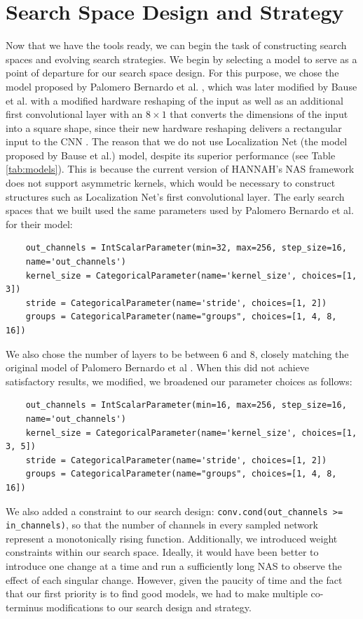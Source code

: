 \documentclass[11pt,a4paper, open=any]{scrbook}
\newcounter{constraint}[chapter]
\newcommand{\py}[1]{\texttt{#1}}
\begin{document}
\section{Search Space Design and Strategy}
Now that we have the tools ready, we can begin the task of constructing search spaces and evolving search strategies. We begin by selecting a model to serve as a point of departure for our search space design. For this purpose, we chose the model proposed by Palomero Bernardo et al. \cite[34]{bernardo25}, which was later modified by Bause et al. with a modified hardware reshaping of the input as well as an additional first convolutional layer with an $8\times 1$ that converts the dimensions of the input into a square shape, since their new hardware reshaping delivers a rectangular input to the CNN \cite[37]{bause25}. The reason that we do not use Localization Net (the model proposed by Bause et al.) model, despite its superior performance (see Table \ref{tab:models}). This is because the current version of HANNAH's NAS framework does not support asymmetric kernels, which would be necessary to construct structures such as Localization Net's first convolutional layer. The early search spaces that we built used the same parameters used by Palomero Bernardo et al. for their model: 

\begin{verbatim}
	out_channels = IntScalarParameter(min=32, max=256, step_size=16,
	name='out_channels')
	kernel_size = CategoricalParameter(name='kernel_size', choices=[1, 3])
	stride = CategoricalParameter(name='stride', choices=[1, 2])
	groups = CategoricalParameter(name="groups", choices=[1, 4, 8, 16])	
\end{verbatim} 

We also chose the number of layers to be between 6 and 8, closely matching the original model of Palomero Bernardo et al \cite[37]{bernardo25}. When this did not achieve satisfactory results, we modified, we broadened our parameter choices as follows:

\begin{verbatim}
	out_channels = IntScalarParameter(min=16, max=256, step_size=16,
	name='out_channels')
	kernel_size = CategoricalParameter(name='kernel_size', choices=[1, 3, 5])
	stride = CategoricalParameter(name='stride', choices=[1, 2])
	groups = CategoricalParameter(name="groups", choices=[1, 4, 8, 16])	
\end{verbatim} 

We also added a constraint to our search design: \py{conv.cond(out_channels >= in_channels)}, so that the number of channels in every sampled network represent a monotonically rising function. Additionally, we introduced weight constraints within our search space. Ideally, it would have been better to introduce one change at a time and run a sufficiently long NAS to observe the effect of each singular change. However, given the paucity of time and the fact that our first priority is to find good models, we had to make multiple co-terminus modifications to our search design and strategy.
\end{document}
